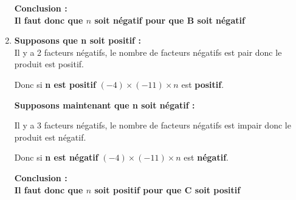 \begin{corrige}
\begin{enumerate}
           \medskip
            {\bfseries \color[HTML]{f15929}Conclusion :} \\
           {\bfseries \color{black}Il faut donc que $ n $ soit négatif pour que B soit négatif}
               \item {\bfseries \color[HTML]{f15929}Supposons que n soit positif : }\\
            Il y a 2 facteurs négatifs, le nombre de facteurs négatifs est pair donc le produit est positif.
           
           \medskip
            Donc si {\bfseries \color{black}n est positif} $ (-4) \times (-11)\times n $ est {\bfseries \color{black}positif}.
           
           \medskip
            {\bfseries \color[HTML]{f15929}Supposons maintenant que n soit négatif : }
           
           \medskip
            Il y a 3 facteurs négatifs, le nombre de facteurs négatifs est impair donc le produit est négatif.
           
           \medskip
            Donc si {\bfseries \color{black}n est négatif} $ (-4) \times (-11)\times n $ est {\bfseries \color{black}négatif}.
           
           \medskip
            {\bfseries \color[HTML]{f15929}Conclusion :} \\
           {\bfseries \color{black}Il faut donc que $ n $ soit positif pour que C soit positif}
        \end{enumerate}
\end{corrige}

